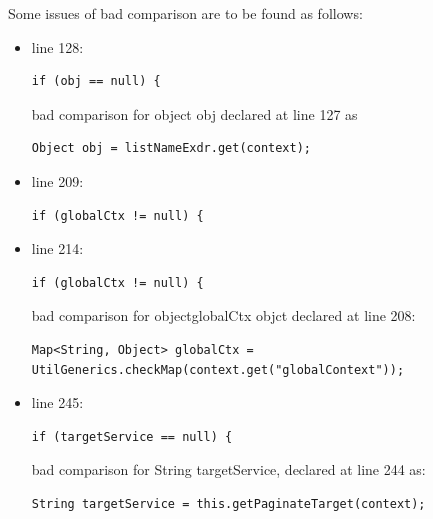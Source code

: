 \documentclass{article}
\begin{document}
\begin{flushleft}
Some issues of bad comparison are to be found as follows:\\
\vspace{0.5cm}

\begin{itemize}
\item  line 128:  \\
\vspace{0.5cm}
\begin{lstlisting}
if (obj == null) {
\end{lstlisting}
\vspace{0.5cm}
bad comparison for object obj declared at line 127 as\\
\vspace{0.5cm}
\begin{lstlisting}
Object obj = listNameExdr.get(context);
\end{lstlisting}
\vspace{0.5cm}
\item line 209:  \\
\vspace{0.5cm}
\begin{lstlisting}
if (globalCtx != null) {
\end{lstlisting}
\vspace{0.5cm}
\item line 214: \\
\vspace{0.5cm}
\begin{lstlisting}
if (globalCtx != null) {
\end{lstlisting}
\vspace{0.5cm}
bad comparison for objectglobalCtx objct declared at line  208:\\
\vspace{0.5cm}
\begin{lstlisting}
Map<String, Object> globalCtx = 
UtilGenerics.checkMap(context.get("globalContext"));
\end{lstlisting}
\vspace{0.5cm}



\item line 245: \\
\vspace{0.5cm}
\begin{lstlisting}
if (targetService == null) {
\end{lstlisting}
\vspace{0.5cm}
bad comparison for String targetService, declared at line 244 as:\\
\vspace{0.5cm}
\begin{lstlisting}
String targetService = this.getPaginateTarget(context);
\end{lstlisting}


\end{itemize}
\end{flushleft}
\end{document}
